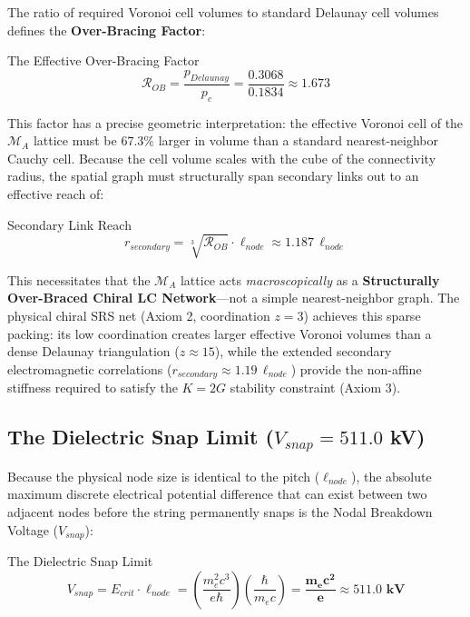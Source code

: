 The ratio of required Voronoi cell volumes to standard Delaunay cell volumes defines the \textbf{Over-Bracing Factor}:
\begin{resultbox}{The Effective Over-Bracing Factor}
\begin{equation}
    \mathcal{R}_{OB} = \frac{p_{Delaunay}}{p_c} = \frac{0.3068}{0.1834} \approx \mathbf{1.673}
\end{equation}
\end{resultbox}

This factor has a precise geometric interpretation: the effective Voronoi cell of the $\mathcal{M}_A$ lattice must be $67.3\%$ larger in volume than a standard nearest-neighbor Cauchy cell. Because the cell volume scales with the cube of the connectivity radius, the spatial graph must structurally span secondary links out to an effective reach of:
\begin{resultbox}{Secondary Link Reach}
\begin{equation}
    r_{secondary} = \sqrt[3]{\mathcal{R}_{OB}} \cdot \ell_{node} \approx 1.187 \, \ell_{node}
\end{equation}
\end{resultbox}

This necessitates that the $\mathcal{M}_A$ lattice acts \textit{macroscopically} as a \textbf{Structurally Over-Braced Chiral LC Network}---not a simple nearest-neighbor graph. The physical chiral SRS net (Axiom 2, coordination $z=3$) achieves this sparse packing: its low coordination creates larger effective Voronoi volumes than a dense Delaunay triangulation ($z \approx 15$), while the extended secondary electromagnetic correlations ($r_{secondary} \approx 1.19\, \ell_{node}$) provide the non-affine stiffness required to satisfy the $K = 2G$ stability constraint (Axiom 3).

\subsection{The Dielectric Snap Limit ($V_{snap} = 511.0$ kV)}
Because the physical node size is identical to the pitch ($\ell_{node}$), the absolute maximum discrete electrical potential difference that can exist between two adjacent nodes before the string permanently snaps is the Nodal Breakdown Voltage ($V_{snap}$):
\begin{resultbox}{The Dielectric Snap Limit}
\begin{equation}
    V_{snap} = E_{crit} \cdot \ell_{node} = \left( \frac{m_e^2 c^3}{e \hbar} \right) \left( \frac{\hbar}{m_e c} \right) = \mathbf{\frac{m_e c^2}{e}} \approx \mathbf{511.0 \text{ kV}}
\end{equation}
\end{resultbox}

